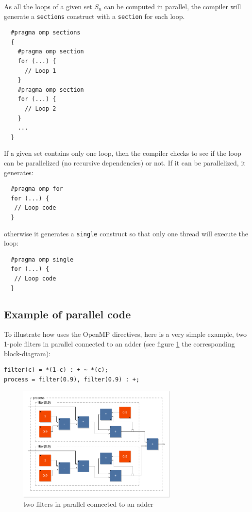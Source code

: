 \documentclass[a4paper]{book}
\begin{document}
As all the loops of a given set $S_n$ can be computed in parallel, the compiler will generate a \lstinline!sections! construct with a \lstinline!section! for each loop. 
\begin{lstlisting}
  #pragma omp sections
  {
    #pragma omp section
    for (...) {
      // Loop 1
    }
    #pragma omp section
    for (...) {
      // Loop 2
    }
    ...
  }
\end{lstlisting}
 
If a given set contains only one loop, then the compiler checks to see if the loop can be parallelized (no recursive dependencies) or not. If it can be parallelized, it generates:
\begin{lstlisting}
  #pragma omp for
  for (...) {
   // Loop code
  }
\end{lstlisting}
otherwise it generates a \lstinline!single! construct so that only one thread will execute the loop:
\begin{lstlisting}
  #pragma omp single
  for (...) {
   // Loop code
  }
\end{lstlisting}

\subsection{Example of parallel code}
To illustrate how \faust uses the OpenMP directives, here is a very simple example, two 1-pole filters in parallel connected to an adder (see figure \ref{fig:parfilter} the corresponding block-diagram):

\begin{lstlisting}
filter(c) = *(1-c) : + ~ *(c);
process = filter(0.9), filter(0.9) : +; 
\end{lstlisting}

\begin{figure}[htb] 
  \centering
  \includegraphics[width=8cm]{images/filter2}
  \caption{two filters in parallel connected to an adder}   
  \label{fig:parfilter}
\end{figure}
\end{document}
